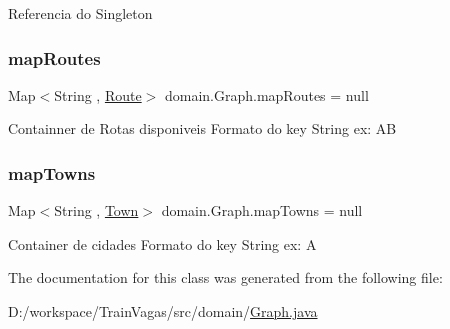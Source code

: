 Referencia do Singleton \mbox{\label{classdomain_1_1_graph_a68332cc928e386e174d90ef23190dc7a}} 
\subsubsection{\texorpdfstring{map\+Routes}{mapRoutes}}
{\footnotesize\ttfamily Map$<$String , \hyperlink{classdomain_1_1_route}{Route}$>$ domain.\+Graph.\+map\+Routes = null\hspace{0.3cm}{\ttfamily [private]}}

Containner de Rotas disponiveis Formato do key String ex\+: \textquotesingle{}AB\textquotesingle{} \mbox{\label{classdomain_1_1_graph_a4fcf559fd3e3579b189ca0c96cf52318}} 
\subsubsection{\texorpdfstring{map\+Towns}{mapTowns}}
{\footnotesize\ttfamily Map$<$String , \hyperlink{classdomain_1_1_town}{Town}$>$ domain.\+Graph.\+map\+Towns = null\hspace{0.3cm}{\ttfamily [private]}}

Container de cidades Formato do key String ex\+: \textquotesingle{}A\textquotesingle{} 

The documentation for this class was generated from the following file\+:\begin{DoxyCompactItemize}
\item 
D\+:/workspace/\+Train\+Vagas/src/domain/\hyperlink{_graph_8java}{Graph.\+java}\end{DoxyCompactItemize}

